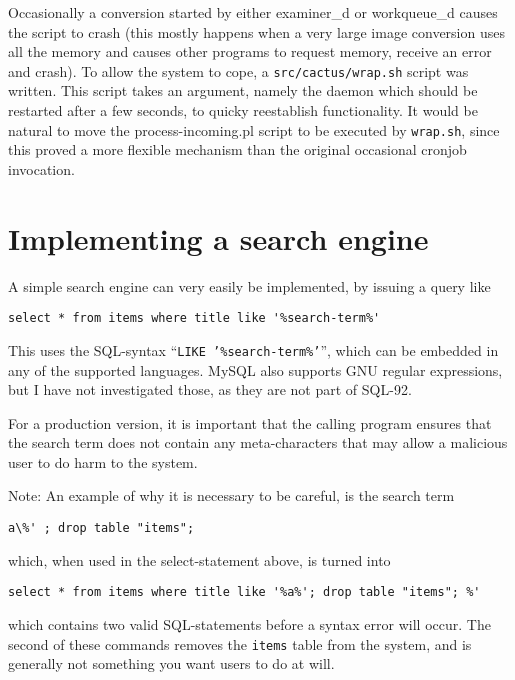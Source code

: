 Occasionally a conversion started by either examiner_d or workqueue_d
causes the script to crash (this mostly happens when a very large
image conversion uses all the memory and causes other programs to
request memory, receive an error and crash).   To allow the system to
cope, a \texttt{src/cactus/wrap.sh} script was written.  This script
takes an argument, namely the daemon which should be restarted after a
few seconds, to quicky reestablish functionality.  It would be natural
to move the process-incoming.pl script to be executed by
\texttt{wrap.sh}, since this proved a more flexible mechanism than the
original occasional cronjob invocation.

\section{Implementing a search engine}

A simple search engine can very easily be implemented, by issuing a
query like

\begin{verbatim}
select * from items where title like '%search-term%'
\end{verbatim}

This uses the SQL-syntax ``\texttt{LIKE '\%search-term\%'}'', which
can be embedded in any of the supported languages.   MySQL also
supports GNU regular expressions, but I have not investigated those,
as they are not part of SQL-92.


For a production version, it is important that the calling program
ensures that the search term does not contain any meta-characters that
may allow a malicious user to do harm to the system.

Note: An example of why it is necessary to be careful, is the search
term
\begin{verbatim}
a\%' ; drop table "items";
\end{verbatim}

which, when used in the select-statement above,
is turned into
\begin{verbatim}
select * from items where title like '%a%'; drop table "items"; %'
\end{verbatim}
which contains two valid SQL-statements before a syntax error will
occur.  The second of these commands removes the \texttt{items} table
from the system, and is generally not something you want users to do
at will.


